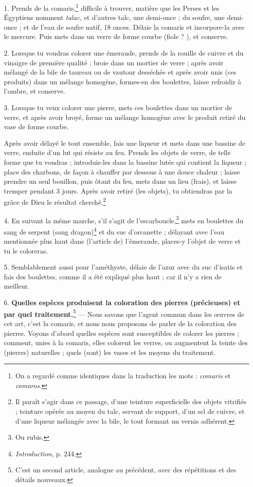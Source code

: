 \documentclass[a4paper, 11pt, oneside, polutonikogreek, french]{article}
\begin{document}
1. Prends de la comaris,\footnote{On a regardé comme identiques dans la traduction les mots : \emph{comaris} et \emph{comaros}.} difficile à trouver, matière que les Perses et les Égyptiens nomment \emph{talac}, et d'autres talc, une demi-once ; du soufre, une demi-once ; et de l'eau de soufre natif, 18 onces. Délaie la comaris et incorpore-la avec le mercure. Puis mets dans un verre de forme courbe (fiole ? ), et conserve.

2. Lorsque tu voudras colorer une émeraude, prends de la rouille de cuivre et du vinaigre de première qualité ; broie dans un mortier de verre ; après avoir mélangé de la bile de taureau ou de vautour desséchée et après avoir unis (ces produits) dans un mélange homogène, formes-en des boulettes, laisse refroidir à l'ombre, et conserve.

3. Lorsque tu veux colorer une pierre, mets ces boulettes dans un mortier de verre, et après avoir broyé, forme un mélange homogène avec le produit retiré du vase de forme courbe.

Après avoir délayé le tout ensemble, fais une liqueur et mets dans une bassine de verre, enduite d'un lut qui résiste au feu. Prends les objets de verre, de telle forme que tu voudras ; introduis-les dans la bassine lutée qui contient la liqueur ; place des charbons, de façon à chauffer par dessous à une douce chaleur ; laisse prendre un seul bouillon, puis ôtant du feu, mets dans un lieu (frais), et laisse tremper pendant 3 jours. Après avoir retiré (les objets), tu obtiendras par la grâce de Dieu le résultat cherché.\footnote{Il paraît s'agir dans ce passage, d'une teinture superficielle des objets vitrifiés ; teinture opérée au moyen du talc, servant de support, d'un sel de cuivre, et d'une liqueur mélangée avec la bile, le tout formant un vernis adhérent.}

4. En suivant la même marche, s'il s'agit de l'escarboucle,\footnote{Ou rubis.} mets en boulettes du sang de serpent (sang dragon)\footnote{\emph{Introduction}, p. 244.} et du suc d'orcanette ; délayant avec l'eau mentionnée plus haut dans (l'article de) l'émeraude, places-y l'objet de verre et tu le coloreras.

5. Semblablement aussi pour l'améthyste, délaie de l'azur avec du suc d'isatis et fais des boulettes, comme il a été expliqué plus haut ; car il n'y a rien de meilleur.

6. \textbf{Quelles espèces produisent la coloration des pierres (précieuses) et par quel traitement.}\footnote{C'est un second article, analogue au précédent, avec des répétitions et des détails nouveaux.} --- Nous savons que l'agent commun dans les œuvres de cet art, c'est la comaris, et nous nous proposons de parler de la coloration des pierres. Voyons d'abord quelles espèces sont susceptibles de colorer les pierres ; comment, unies à la comaris, elles colorent les verres, ou augmentent la teinte des (pierres) naturelles ; quels (sont) les vases et les moyens du traitement.
\end{document}
